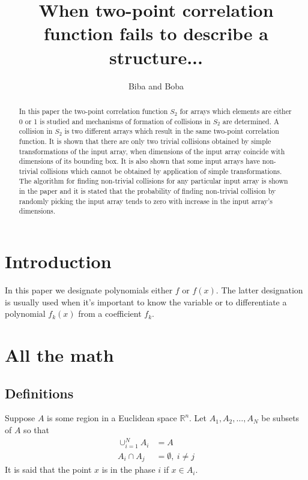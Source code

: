 \documentclass[12pt, a4paper]{article}
\begin{document}
\title{When two-point correlation function fails to describe a structure...}
\author{Biba and Boba}
\maketitle

\begin{abstract}
  In this paper the two-point correlation function $S_2$ for arrays which
  elements are either 0 or 1 is studied and mechanisms of formation of
  collisions in $S_2$ are determined. A collision in $S_2$ is two different
  arrays which result in the same two-point correlation function. It is shown
  that there are only two trivial collisions obtained by simple transformations
  of the input array, when dimensions of the input array coincide with
  dimensions of its bounding box. It is also shown that some input arrays have
  non-trivial collisions which cannot be obtained by application of simple
  transformations. The algorithm for finding non-trivial collisions for any
  particular input array is shown in the paper and it is stated that the
  probability of finding non-trivial collision by randomly picking the input
  array tends to zero with increase in the input array's dimensions.
\end{abstract}

\section{Introduction}
In this paper we designate polynomials either $f$ or $f(x)$. The latter
designation is usually used when it's important to know the variable or to
differentiate a polynomial $f_k(x)$ from a coefficient $f_k$.

\section{All the math}
\subsection{Definitions}
Suppose $A$ is some region in a Euclidean space $\mathbb{R}^n$. Let
$A_1, A_2, \dots, A_N$ be subsets of $A$ so that
\begin{align*}
  \cup_{i=1}^N A_i &= A \\
  A_i \cap A_j &= \emptyset, \ i \ne j
\end{align*}
It is said that the point $x$ is in the phase $i$ if $x \in A_i$.
\end{document}
